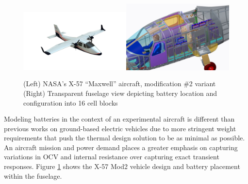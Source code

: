 \documentclass[]{aiaa-tc}%
\begin{document}
\begin{figure}[!htb]%
	\centering
	\includegraphics[width=0.5\textwidth]{figures/X57_mod2.png}\includegraphics[width=0.5\textwidth]{figures/batt_loc.png}
	\caption{(Left) NASA's X-57 ``Maxwell'' aircraft, modification \#2 variant
	(Right) Transparent fuselage view depicting battery location and configuration into 16 cell blocks}
	\label{fig:X57}
\end{figure}

Modeling batteries in the context of an experimental aircraft is different than previous works on ground-based electric vehicles due to more stringent weight requirements that push the thermal design solution to be as minimal as possible. An aircraft mission and power demand places a greater emphasis on capturing variations in OCV and internal resistance over capturing exact transient responses. Figure \ref{fig:X57} shows the X-57 Mod2 vehicle design and battery placement within the fuselage. 
\end{document}
